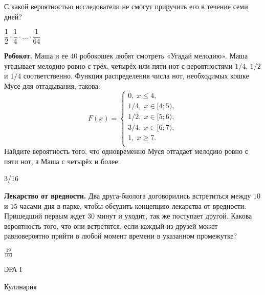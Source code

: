 \documentclass[12pt, addpoints]{exam} %
\renewcommand{\leq}{\leqslant}
\renewcommand{\geq}{\geqslant}
\begin{document}
\begin{questions}
С какой вероятностью исследователи не смогут приручить его в течение семи дней?
\begin{solution}
 $\dfrac12\cdot\dfrac14\cdot \ldots \cdot\dfrac{1}{64}$
\end{solution}

\question \textbf{Робокот.} Маша и ее $40$ робокошек любят смотреть «Угадай мелодию».  Маша угадывает мелодию ровно с трёх, четырёх или пяти нот с вероятностями $1/4$, $1/2$ и $1/4$ соответственно. Функция распределения числа нот, необходимых кошке Мусе для отгадывания, такова:
\[
F(x)=\begin{cases}
0, \; x \leq4, \\
1/4, \; x \in[4;5),\\
1/2, \; x \in[5;6),\\
3/4, \; x \in[6;7),\\
1, \; x \geq7. \\
\end{cases}
\]
Найдите вероятность того, что одновременно Муся отгадает мелодию ровно с пяти нот, а Маша с четырёх и более.

\begin{solution}
 3/16
\end{solution}

\question \textbf{Лекарство от вредности.} Два друга-биолога договорились встретиться между $10$ и $15$ часами дня в парке, чтобы обсудить концепцию лекарства от вредности. Пришедший первым ждет $30$ минут и уходит, так же поступает другой. Какова вероятность того, что они встретятся, если каждый из друзей может равновероятно прийти в любой момент времени в указанном промежутке?

\begin{solution}
$\frac{19}{100}$
\end{solution}

\end{questions}


\newpage

\begin{center}
ЭРА I
\end{center}

\begin{center}
Кулинария
\end{center}
\end{document}

